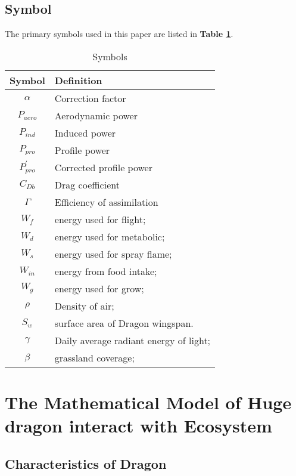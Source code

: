 \documentclass[12pt]{article}
\begin{document}
\subsection{Symbol}%
The primary symbols used in this paper are listed in \textbf{Table \ref{tb:symbol}}.
\begin{table}[!htbp]
\begin{center}
\caption{Symbols}
\begin{tabular}{cl}
	\toprule
	\multicolumn{1}{m{3cm}}{\centering Symbol}
	&\multicolumn{1}{m{8cm}}{\centering Definition}\\
	\midrule
	$\alpha$ &Correction factor\\
	$P_{aero}$ &Aerodynamic power\\
	$P_{ind}$ &Induced power\\
	$P_{pro}$ &Profile power\\
	$P_{pro}^{'}$ &Corrected profile power\\
	$C_{Db}$ &Drag coefficient\\
	$\Gamma$ &Efficiency of assimilation\\
	$W_f$ & energy used for flight;\\
	$W_d$ & energy used for metabolic;\\
	$W_s$ & energy used for spray flame;\\
	$W_{in}$ & energy from food intake;\\
	$W_g$ & energy used for grow;\\
	$\rho$ & Density of air;\\
	$S_w$ & surface area of Dragon wingspan.\\
	$\gamma$ & Daily average radiant energy of light;\\
	$\beta$ & grassland coverage;\\
	\bottomrule
\end{tabular}\label{tb:symbol}
\end{center}
\end{table}

\section{The Mathematical Model of Huge dragon interact with Ecosystem}%
\subsection{Characteristics of Dragon}%
\end{document}
